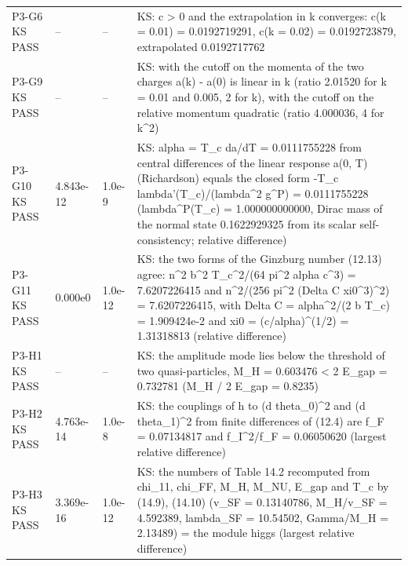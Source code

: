 \documentclass[aps,prd,onecolumn,superscriptaddress,nofootinbib,floatfix,longbibliography]{revtex4-2}
\begin{document}
\begin{longtable}{p{}p{}p{}p{}}
P3-G6 KS \newline PASS & -- & -- & KS: c \textgreater{} 0 and the extrapolation in k converges: c(k = 0.01) = 0.0192719291, c(k = 0.02) = 0.0192723879, extrapolated 0.0192717762 \\
P3-G9 KS \newline PASS & -- & -- & KS: with the cutoff on the momenta of the two charges a(k) - a(0) is linear in \textbar{}k\textbar{} (ratio 2.01520 for k = 0.01 and 0.005, 2 for \textbar{}k\textbar{}), with the cutoff on the relative momentum quadratic (ratio 4.000036, 4 for k\textasciicircum{}2) \\
P3-G10 KS \newline PASS & 4.843e-12 & 1.0e-9 & KS: alpha = T\_c da/dT = 0.0111755228 from central differences of the linear response a(0, T) (Richardson) equals the closed form -T\_c lambda'(T\_c)/(lambda\textasciicircum{}2 g\textasciicircum{}P) = 0.0111755228 (lambda\textasciicircum{}P(T\_c) = 1.000000000000, Dirac mass of the normal state 0.1622929325 from its scalar self-consistency; relative difference) \\
P3-G11 KS \newline PASS & 0.000e0 & 1.0e-12 & KS: the two forms of the Ginzburg number (12.13) agree: n\textasciicircum{}2 b\textasciicircum{}2 T\_c\textasciicircum{}2/(64 pi\textasciicircum{}2 alpha c\textasciicircum{}3) = 7.6207226415 and n\textasciicircum{}2/(256 pi\textasciicircum{}2 (Delta C xi0\textasciicircum{}3)\textasciicircum{}2) = 7.6207226415, with Delta C = alpha\textasciicircum{}2/(2 b T\_c) = 1.909424e-2 and xi0 = (c/alpha)\textasciicircum{}(1/2) = 1.31318813 (relative difference) \\
P3-H1 KS \newline PASS & -- & -- & KS: the amplitude mode lies below the threshold of two quasi-particles, M\_H = 0.603476 \textless{} 2 E\_gap = 0.732781 (M\_H / 2 E\_gap = 0.8235) \\
P3-H2 KS \newline PASS & 4.763e-14 & 1.0e-8 & KS: the couplings of h to (d theta\_0)\textasciicircum{}2 and (d theta\_1)\textasciicircum{}2 from finite differences of (12.4) are f\_F = 0.07134817 and f\_I\textasciicircum{}2/f\_F = 0.06050620 (largest relative difference) \\
P3-H3 KS \newline PASS & 3.369e-16 & 1.0e-12 & KS: the numbers of Table 14.2 recomputed from chi\_11, chi\_FF, M\_H, M\_NU, E\_gap and T\_c by (14.9), (14.10) (v\_SF = 0.13140786, M\_H/v\_SF = 4.592389, lambda\_SF = 10.54502, Gamma/M\_H = 2.13489) = the module higgs (largest relative difference) \\

\end{longtable}
\end{document}
